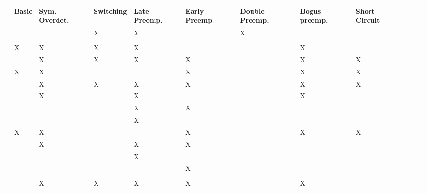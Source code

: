 \documentclass[11pt,a4paper]{book}
\theoremstyle{definition}
\theoremstyle{definition}
\theoremstyle{definition}
\theoremstyle{remark}
\begin{document}
 \begin{table}
\centering
\scriptsize
\begin{tabular}{lp{1.25cm}p{1.25cm}p{1.25cm}p{1.15cm}p{1.25cm}p{1.25cm}p{1.25cm}p{1.25cm}p{1.25cm}p{1.25cm}p{1.25cm}}
\toprule
	& Basic	& Sym. Overdet.	& Switching	& Late Preemp.	& Early Preemp.	& Double Preemp.	& Bogus preemp.	& Short Circuit	\\
	\midrule 	 	 	 	 	 	 	 	 
	 	 	 	 	 	 	 	 	 
	 	 	 	 	 	 	 	 	 
	 	 	 	 	 	 	 	 	 
 \cite{glymour2010actual}	& 	& 	& X	& X	& 	& X	& 	& 	 \\ 
	 	 	 	 	 	 	 	 	 
 \cite{gerstenberg2010spreading}	& 	& 	& 	& 	& 	& 	& 	& 	 \\ 
 \cite{halpern2011actual} 	& X	& X	& X	& X	& 	& 	& X	& 	 \\ 
	 	 	 	 	 	 	 	 	 
	 	 	 	 	 	 	 	 	 
 \cite{baumgartner2013regularity} 	& 	& X	& X	& X	& X	& 	& X	& X	 \\ 
	 	 	 	 	 	 	 	 	 
 \cite{halpern2015graded} 	& X	& X	& 	& 	& X	& 	& X	& X	 \\ 
 \cite{weslake2015partial} 	& 	& X	& X	& X	& X	& 	& X	& X	 \\ 
 \cite{chockler2015causal}  	& 	& X	& 	& X	& 	& 	& X	& 	 \\ 
 \cite{beckers2016general} 	& 	& 	& 	& X	& X	& 	& 	& 	 \\ 
	 	 	 	 	 	 	 	 	 
 \cite{halpern2016appropriate} 	& 	& 	& 	& X	& 	& 	& 	& 	 \\ 
 \cite{blanchard2017cause}  	& X	& X	& 	& 	& X	& 	& X	& X	 \\ 
 \cite{wright2017ness}  	& 	& X	& 	& X	& X	& 	& 	& 	 \\ 
	 	 	 	 	 	 	 	 	 
 \cite{aleksandrowicz2017computational}  	& 	& 	& 	& X	& 	& 	& 	& 	 \\ 
 \cite{fenton2017proposed}  	& 	& 	& 	& 	& X	& 	& 	& 	 \\ 
 \cite{lagnado2017causation}  	& 	& 	& 	& 	& 	& 	& 	& 	 \\ 
 \cite{bochman2018actual}  	& 	& X	& X	& X	& X	& 	& X	& 	 \\ 
	 	 	 	 	 	 	 	 	 

\end{tabular}
\end{table}
\end{document}
